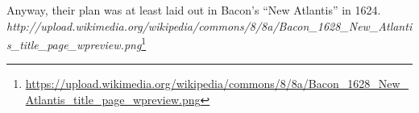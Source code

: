 \begin{footnotesize}
\begin{sffamily}
Anyway, their plan was at least laid out in Bacon's ``New Atlantis'' in 1624.\\
\textit{http://upload.wikimedia.org/wikipedia/commons/8/8a/Bacon\_1628\_New\_Atlantis\_title\_page\_wpreview.png}\footnote{\url{https://upload.wikimedia.org/wikipedia/commons/8/8a/Bacon\_1628\_New\_Atlantis\_title\_page\_wpreview.png}}



\hfill

\end{sffamily}
\end{footnotesize}

